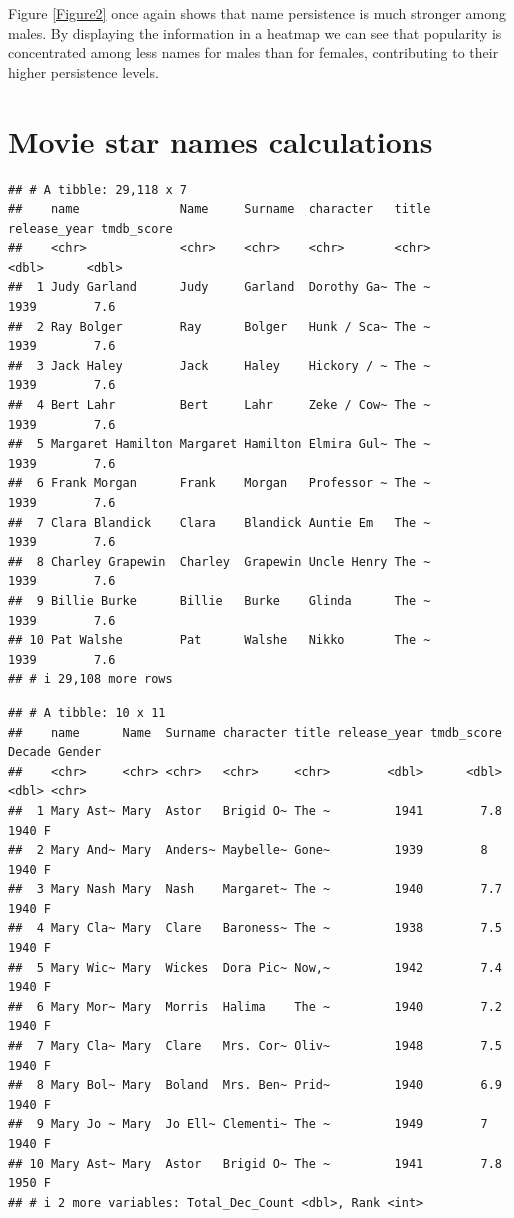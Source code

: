 \documentclass[11pt,preprint]{elsarticle}
\let\origfigure\figure
\let\endorigfigure\endfigure
\renewenvironment{figure}[1][2] {
    \expandafter\origfigure\expandafter[H]
} {
    \endorigfigure
}
\numberwithin{equation}{section}
\numberwithin{figure}{section}
\numberwithin{table}{section}
\begin{document}
\begin{figure}[H]
{}

\caption{Persistence of National Top 10 Baby Names per decade (1910-2014).\label{Figure2}}\label{fig:unnamed-chunk-4}
\end{figure}

Figure \ref{Figure2} once again shows that name persistence is much
stronger among males. By displaying the information in a heatmap we can
see that popularity is concentrated among less names for males than for
females, contributing to their higher persistence levels.

\newpage

\section{Movie star names
calculations}\label{movie-star-names-calculations}

\begin{verbatim}
## # A tibble: 29,118 x 7
##    name              Name     Surname  character   title release_year tmdb_score
##    <chr>             <chr>    <chr>    <chr>       <chr>        <dbl>      <dbl>
##  1 Judy Garland      Judy     Garland  Dorothy Ga~ The ~         1939        7.6
##  2 Ray Bolger        Ray      Bolger   Hunk / Sca~ The ~         1939        7.6
##  3 Jack Haley        Jack     Haley    Hickory / ~ The ~         1939        7.6
##  4 Bert Lahr         Bert     Lahr     Zeke / Cow~ The ~         1939        7.6
##  5 Margaret Hamilton Margaret Hamilton Elmira Gul~ The ~         1939        7.6
##  6 Frank Morgan      Frank    Morgan   Professor ~ The ~         1939        7.6
##  7 Clara Blandick    Clara    Blandick Auntie Em   The ~         1939        7.6
##  8 Charley Grapewin  Charley  Grapewin Uncle Henry The ~         1939        7.6
##  9 Billie Burke      Billie   Burke    Glinda      The ~         1939        7.6
## 10 Pat Walshe        Pat      Walshe   Nikko       The ~         1939        7.6
## # i 29,108 more rows
\end{verbatim}

\begin{verbatim}
## # A tibble: 10 x 11
##    name      Name  Surname character title release_year tmdb_score Decade Gender
##    <chr>     <chr> <chr>   <chr>     <chr>        <dbl>      <dbl>  <dbl> <chr> 
##  1 Mary Ast~ Mary  Astor   Brigid O~ The ~         1941        7.8   1940 F     
##  2 Mary And~ Mary  Anders~ Maybelle~ Gone~         1939        8     1940 F     
##  3 Mary Nash Mary  Nash    Margaret~ The ~         1940        7.7   1940 F     
##  4 Mary Cla~ Mary  Clare   Baroness~ The ~         1938        7.5   1940 F     
##  5 Mary Wic~ Mary  Wickes  Dora Pic~ Now,~         1942        7.4   1940 F     
##  6 Mary Mor~ Mary  Morris  Halima    The ~         1940        7.2   1940 F     
##  7 Mary Cla~ Mary  Clare   Mrs. Cor~ Oliv~         1948        7.5   1940 F     
##  8 Mary Bol~ Mary  Boland  Mrs. Ben~ Prid~         1940        6.9   1940 F     
##  9 Mary Jo ~ Mary  Jo Ell~ Clementi~ The ~         1949        7     1940 F     
## 10 Mary Ast~ Mary  Astor   Brigid O~ The ~         1941        7.8   1950 F     
## # i 2 more variables: Total_Dec_Count <dbl>, Rank <int>
\end{verbatim}
\end{document}
